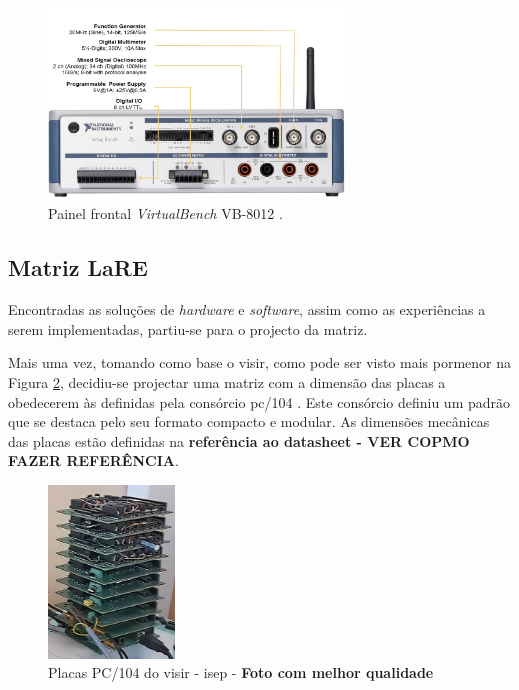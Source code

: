 \begin{figure}[hbtp]
    \centering
    \includegraphics[width=0.7\textwidth]{figures/virtualbench_front-panel.jpg}
    \caption{Painel frontal \textit{VirtualBench} VB-8012  \cite{datasheetVirtualBench}.}
    \label{fig:paineldianteiro}
\end{figure}


\subsection{Matriz LaRE}
\label{sec:matriz}
Encontradas as soluções de \textit{hardware} e \textit{software}, assim como as experiências a serem implementadas, partiu-se para o projecto da matriz.

Mais uma vez, tomando como base o \acrshort{visir}, como pode ser visto mais pormenor na Figura \ref{fig:visir104}, decidiu-se projectar uma matriz com a dimensão das placas a obedecerem às definidas pela consórcio \gls{pc/104} \cite{PC104}. Este consórcio definiu um padrão que se destaca pelo seu formato compacto e modular. As dimensões mecânicas das placas estão definidas na \textbf{referência ao datasheet - VER COPMO FAZER REFERÊNCIA}.

\begin{figure}[hbtp]
    \centering
    \includegraphics[width=0.3\textwidth]{figures/promenorvisirISEP.png}
    \caption{Placas PC/104 do \acrshort{visir} - \acrshort{isep} - \textbf{Foto com melhor qualidade}}
    \label{fig:visir104}
\end{figure}

